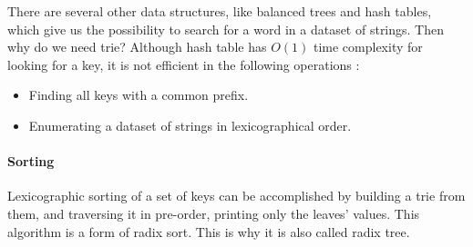 \documentclass[../main.tex]{subfiles}
\begin{document}
 
 
         
 
 
 
 
 
 
 
There are several other data structures, like balanced trees and hash tables, which give us the possibility to search for a word in a dataset of strings. Then why do we need trie? Although hash table has $O(1)$ time complexity for looking for a key, it is not efficient in the following operations :
\begin{itemize}
    \item Finding all keys with a common prefix.
    \item Enumerating a dataset of strings in lexicographical order.
\end{itemize}

\paragraph{Sorting}
Lexicographic sorting of a set of keys can be accomplished by building a trie from them, and traversing it in pre-order, printing only the leaves' values. This algorithm is a form of radix sort. This is why it is also called radix tree. 
\end{document}
